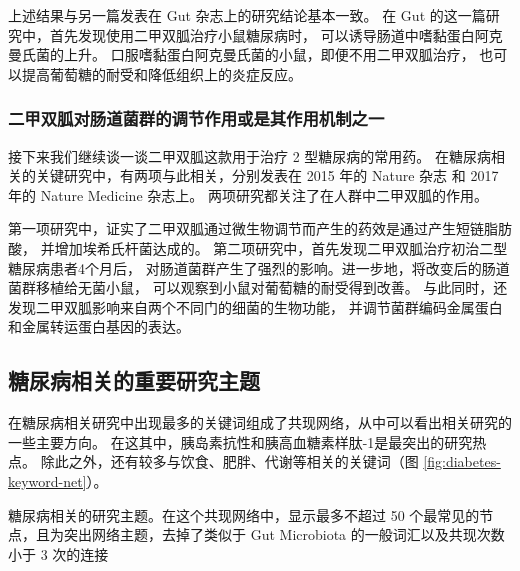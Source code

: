 \documentclass[]{ctexbook}
\begin{document}
上述结果与另一篇发表在 Gut 杂志上的研究结论基本一致\citep{shinIncreaseAkkermansiaSpp2014}。
在 Gut 的这一篇研究中，首先发现使用二甲双胍治疗小鼠糖尿病时，
可以诱导肠道中嗜黏蛋白阿克曼氏菌的上升。
口服嗜黏蛋白阿克曼氏菌的小鼠，即便不用二甲双胍治疗，
也可以提高葡萄糖的耐受和降低组织上的炎症反应。

\hypertarget{ux4e8cux7532ux53ccux80cdux5bf9ux80a0ux9053ux83ccux7fa4ux7684ux8c03ux8282ux4f5cux7528ux6216ux662fux5176ux4f5cux7528ux673aux5236ux4e4bux4e00}{%
\subsubsection{二甲双胍对肠道菌群的调节作用或是其作用机制之一}\label{ux4e8cux7532ux53ccux80cdux5bf9ux80a0ux9053ux83ccux7fa4ux7684ux8c03ux8282ux4f5cux7528ux6216ux662fux5176ux4f5cux7528ux673aux5236ux4e4bux4e00}}

接下来我们继续谈一谈二甲双胍这款用于治疗 2 型糖尿病的常用药。
在糖尿病相关的关键研究中，有两项与此相关，分别发表在 2015 年的 Nature 杂志
和 2017 年的 Nature Medicine 杂志上。
两项研究都关注了在人群中二甲双胍的作用。

第一项研究中，证实了二甲双胍通过微生物调节而产生的药效是通过产生短链脂肪酸，
并增加埃希氏杆菌达成的\citep{forslundDisentanglingTypeDiabetes2015a}。
第二项研究中，首先发现二甲双胍治疗初治二型糖尿病患者4个月后，
对肠道菌群产生了强烈的影响。进一步地，将改变后的肠道菌群移植给无菌小鼠，
可以观察到小鼠对葡萄糖的耐受得到改善。
与此同时，还发现二甲双胍影响来自两个不同门的细菌的生物功能，
并调节菌群编码金属蛋白和金属转运蛋白基因的表达\citep{wuMetforminAltersGut2017}。

\hypertarget{ux7cd6ux5c3fux75c5ux76f8ux5173ux7684ux91cdux8981ux7814ux7a76ux4e3bux9898}{%
\subsection{糖尿病相关的重要研究主题}\label{ux7cd6ux5c3fux75c5ux76f8ux5173ux7684ux91cdux8981ux7814ux7a76ux4e3bux9898}}

在糖尿病相关研究中出现最多的关键词组成了共现网络，从中可以看出相关研究的一些主要方向。
在这其中，胰岛素抗性和胰高血糖素样肽-1是最突出的研究热点。
除此之外，还有较多与饮食、肥胖、代谢等相关的关键词（图 \ref{fig:diabetes-keyword-net}）。

\hypertarget{htmlwidget-e74b9e239436c0741b6f}{}

\label{fig:diabetes-keyword-net}糖尿病相关的研究主题。在这个共现网络中，显示最多不超过 50 个最常见的节点，且为突出网络主题，去掉了类似于 Gut Microbiota 的一般词汇以及共现次数小于 3 次的连接
\end{document}
